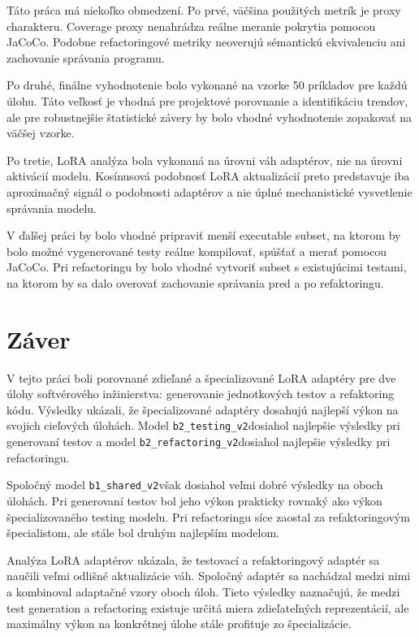 \documentclass[11pt,a4paper]{article}
\newcommand{\modeltest}{\texttt{b2\_testing\_v2}}
\newcommand{\modelref}{\texttt{b2\_refactoring\_v2}}
\newcommand{\modelshared}{\texttt{b1\_shared\_v2}}
\begin{document}
Táto práca má niekoľko obmedzení. Po prvé, väčšina použitých metrík je proxy charakteru. Coverage proxy nenahrádza reálne meranie pokrytia pomocou JaCoCo. Podobne refactoringové metriky neoverujú sémantickú ekvivalenciu ani zachovanie správania programu.

Po druhé, finálne vyhodnotenie bolo vykonané na vzorke 50 príkladov pre každú úlohu. Táto veľkosť je vhodná pre projektové porovnanie a identifikáciu trendov, ale pre robustnejšie štatistické závery by bolo vhodné vyhodnotenie zopakovať na väčšej vzorke.

Po tretie, LoRA analýza bola vykonaná na úrovni váh adaptérov, nie na úrovni aktivácií modelu. Kosínusová podobnosť LoRA aktualizácií preto predstavuje iba aproximačný signál o podobnosti adaptérov a nie úplné mechanistické vysvetlenie správania modelu.

V ďalšej práci by bolo vhodné pripraviť menší executable subset, na ktorom by bolo možné vygenerované testy reálne kompilovať, spúšťať a merať pomocou JaCoCo. Pri refactoringu by bolo vhodné vytvoriť subset s existujúcimi testami, na ktorom by sa dalo overovať zachovanie správania pred a po refaktoringu.

\section{Záver}

V tejto práci boli porovnané zdieľané a špecializované LoRA adaptéry pre dve úlohy softvérového inžinierstva: generovanie jednotkových testov a refaktoring kódu. Výsledky ukázali, že špecializované adaptéry dosahujú najlepší výkon na svojich cieľových úlohách. Model \modeltest dosiahol najlepšie výsledky pri generovaní testov a model \modelref dosiahol najlepšie výsledky pri refactoringu.

Spoločný model \modelshared však dosiahol veľmi dobré výsledky na oboch úlohách. Pri generovaní testov bol jeho výkon prakticky rovnaký ako výkon špecializovaného testing modelu. Pri refactoringu síce zaostal za refaktoringovým špecialistom, ale stále bol druhým najlepším modelom.

Analýza LoRA adaptérov ukázala, že testovací a refaktoringový adaptér sa naučili veľmi odlišné aktualizácie váh. Spoločný adaptér sa nachádzal medzi nimi a kombinoval adaptačné vzory oboch úloh. Tieto výsledky naznačujú, že medzi test generation a refactoring existuje určitá miera zdieľateľných reprezentácií, ale maximálny výkon na konkrétnej úlohe stále profituje zo špecializácie.
\end{document}
